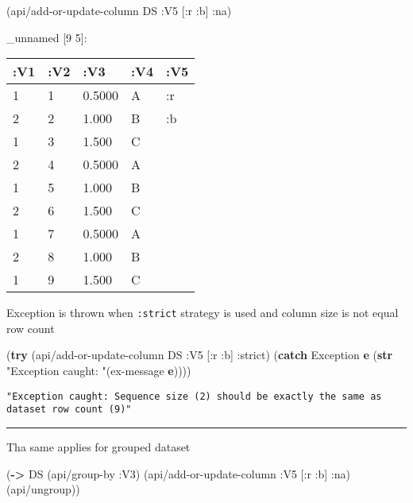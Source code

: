 \documentclass[]{article}
\newenvironment{Shaded}{\begin{snugshade}}{\end{snugshade}}
\newcommand{\KeywordTok}[1]{\textcolor[rgb]{0.13,0.29,0.53}{\textbf{#1}}}
\newcommand{\StringTok}[1]{\textcolor[rgb]{0.31,0.60,0.02}{#1}}
\newcommand{\AttributeTok}[1]{\textcolor[rgb]{0.77,0.63,0.00}{#1}}
\newcommand{\NormalTok}[1]{#1}
\begin{document}
\begin{Shaded}
\begin{Highlighting}[]
\NormalTok{(api/add-or-update-column DS }\AttributeTok{:V5}\NormalTok{ [}\AttributeTok{:r} \AttributeTok{:b}\NormalTok{] }\AttributeTok{:na}\NormalTok{)}
\end{Highlighting}
\end{Shaded}

\_unnamed {[}9 5{]}:

\begin{longtable}[]{@{}lllll@{}}
\toprule
:V1 & :V2 & :V3 & :V4 & :V5\tabularnewline
\midrule
\endhead
1 & 1 & 0.5000 & A & :r\tabularnewline
2 & 2 & 1.000 & B & :b\tabularnewline
1 & 3 & 1.500 & C &\tabularnewline
2 & 4 & 0.5000 & A &\tabularnewline
1 & 5 & 1.000 & B &\tabularnewline
2 & 6 & 1.500 & C &\tabularnewline
1 & 7 & 0.5000 & A &\tabularnewline
2 & 8 & 1.000 & B &\tabularnewline
1 & 9 & 1.500 & C &\tabularnewline
\bottomrule
\end{longtable}

Exception is thrown when \texttt{:strict} strategy is used and column
size is not equal row count

\begin{Shaded}
\begin{Highlighting}[]
\NormalTok{(}\KeywordTok{try}
\NormalTok{  (api/add-or-update-column DS }\AttributeTok{:V5}\NormalTok{ [}\AttributeTok{:r} \AttributeTok{:b}\NormalTok{] }\AttributeTok{:strict}\NormalTok{)}
\NormalTok{  (}\KeywordTok{catch}\NormalTok{ Exception }\KeywordTok{e}\NormalTok{ (}\KeywordTok{str} \StringTok{"Exception caught: "}\NormalTok{(ex-message }\KeywordTok{e}\NormalTok{))))}
\end{Highlighting}
\end{Shaded}

\begin{verbatim}
"Exception caught: Sequence size (2) should be exactly the same as dataset row count (9)"
\end{verbatim}

\begin{center}\rule{0.5\linewidth}{0.5pt}\end{center}

Tha same applies for grouped dataset

\begin{Shaded}
\begin{Highlighting}[]
\NormalTok{(}\KeywordTok{->}\NormalTok{ DS}
\NormalTok{    (api/group-by }\AttributeTok{:V3}\NormalTok{)}
\NormalTok{    (api/add-or-update-column }\AttributeTok{:V5}\NormalTok{ [}\AttributeTok{:r} \AttributeTok{:b}\NormalTok{] }\AttributeTok{:na}\NormalTok{)}
\NormalTok{    (api/ungroup))}
\end{Highlighting}
\end{Shaded}
\end{document}
